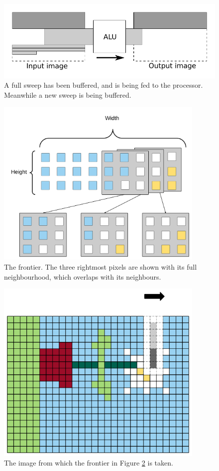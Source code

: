 \begin{figure}[h!]
    \includegraphics[width=\linewidth]{img/daisy_processing.pdf}
    \caption[Buffering and feeding of sweeps.]{A full sweep has been buffered, and is being fed to the processor. Meanwhile a new sweep is being buffered.}
    \label{fig:sweep_feed}
\end{figure}

\begin{figure}[h!]
    \centering
    \includegraphics[width=10cm]{img/frontier1.png}
    \caption[The frontier.]{The frontier. The three rightmost pixels are shown with its full neighbourhood, which overlaps with its neighbours.}
    \label{fig:frontier1}
\end{figure}

\begin{figure}[h!]
    \centering
    \includegraphics[width=10cm]{img/frontier2.png}
    \caption{The image from which the frontier in Figure \ref{fig:frontier1} is taken.}
    \label{fig:frontier2}
\end{figure}
